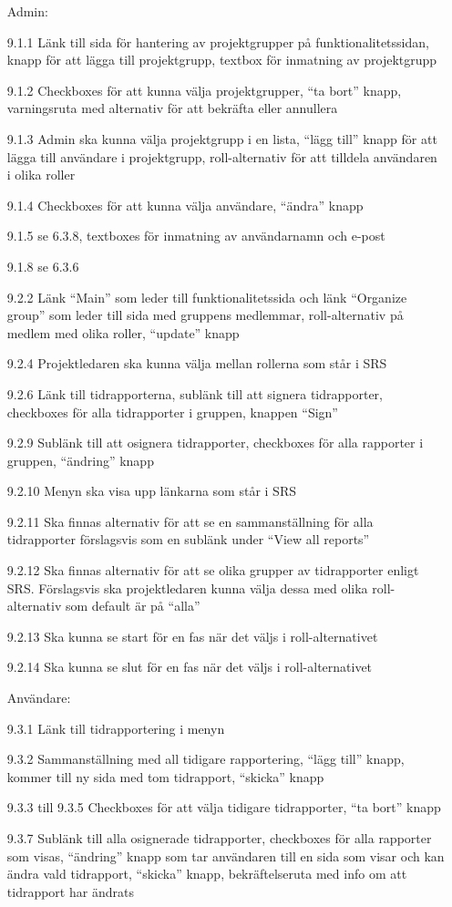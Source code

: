 \documentclass[paper=a4, fontsize=11pt,twoside]{article}
\begin{document}
\begin{itemize}
Admin:
\item[9.1.1] Länk till sida för hantering av projektgrupper på funktionalitetssidan, knapp för att lägga till projektgrupp, textbox för inmatning av projektgrupp
\item[9.1.2] Checkboxes för att kunna välja projektgrupper, “ta bort” knapp, varningsruta med alternativ för att bekräfta eller annullera
\item[9.1.3] Admin ska kunna välja projektgrupp i en lista, “lägg till” knapp för att lägga till användare i projektgrupp, roll-alternativ för att tilldela användaren i olika roller
\item[9.1.4] Checkboxes för att kunna välja användare, “ändra” knapp
\item[9.1.5] se 6.3.8, textboxes för inmatning av användarnamn och e-post
\item[9.1.8] se 6.3.6

\item[9.2.2] Länk “Main” som leder till funktionalitetssida och länk “Organize group” som leder till sida med gruppens medlemmar, roll-alternativ på medlem med olika roller, “update” knapp
\item[9.2.4] Projektledaren ska kunna välja mellan rollerna som står i SRS
\item[9.2.6] Länk till tidrapporterna, sublänk till att signera tidrapporter, checkboxes för alla tidrapporter i gruppen, knappen “Sign”
\item[9.2.9] Sublänk till att osignera tidrapporter, checkboxes för alla rapporter i gruppen, “ändring” knapp
\item[9.2.10] Menyn ska visa upp länkarna som står i SRS
\item[9.2.11] Ska finnas alternativ för att se en sammanställning för alla tidrapporter förslagsvis som en sublänk under “View all reports”
\item[9.2.12] Ska finnas alternativ för att se olika grupper av tidrapporter enligt SRS. Förslagsvis ska projektledaren kunna välja dessa med olika roll-alternativ som default är på “alla”
\item[9.2.13] Ska kunna se start för en fas när det väljs i roll-alternativet
\item[9.2.14] Ska kunna se slut för en fas när det väljs i roll-alternativet

Användare:
\item[9.3.1] Länk till tidrapportering i menyn
\item[9.3.2] Sammanställning med all tidigare rapportering, “lägg till” knapp, kommer till ny sida med tom tidrapport, “skicka” knapp
\item[9.3.3 till 9.3.5] Checkboxes för att välja tidigare tidrapporter, “ta bort” knapp
\item[9.3.7]Sublänk till alla osignerade tidrapporter, checkboxes för alla rapporter som visas, “ändring” knapp som tar användaren till en sida som visar och kan ändra vald tidrapport, “skicka” knapp, bekräftelseruta med info om att tidrapport har ändrats
\end{itemize}
\end{document}
